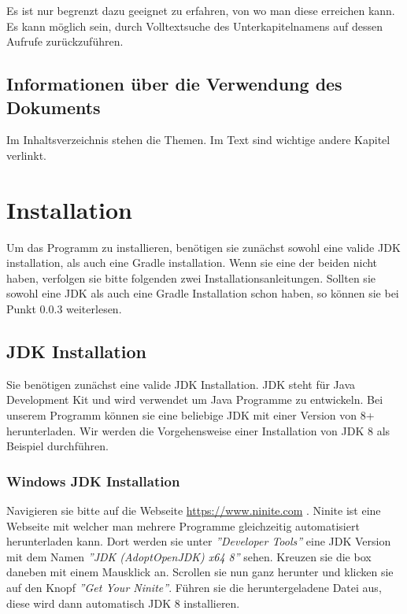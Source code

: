 \documentclass[fontsize=12pt,paper=a4,twoside]{scrartcl}
\begin{document}
Es ist nur begrenzt dazu geeignet zu erfahren, von wo man diese erreichen kann. Es kann möglich sein, durch Volltextsuche des Unterkapitelnamens auf dessen Aufrufe zurückzuführen.

\subsection{Informationen über die Verwendung des Dokuments}

Im Inhaltsverzeichnis stehen die Themen. Im Text sind wichtige andere Kapitel verlinkt. 

\newpage






\section{Installation}

Um das Programm zu installieren, benötigen sie zunächst sowohl eine valide JDK 
installation, als auch eine Gradle installation. Wenn sie eine der beiden nicht haben, 
verfolgen sie bitte folgenden zwei Installationsanleitungen. Sollten sie sowohl eine JDK 
als auch eine Gradle Installation schon haben, so können sie bei Punkt 0.0.3 
weiterlesen.

\subsection{JDK Installation}

Sie benötigen zunächst eine valide JDK Installation. JDK steht für Java Development Kit und wird verwendet um Java Programme zu entwickeln.
Bei unserem Programm können sie eine beliebige JDK mit einer Version von 8+ herunterladen. Wir werden die Vorgehensweise einer Installation von JDK  8 als Beispiel durchführen.

\subsubsection{Windows JDK Installation}

Navigieren sie bitte auf die Webseite \url{https://www.ninite.com} . Ninite ist eine Webseite mit welcher man mehrere Programme gleichzeitig automatisiert herunterladen kann. Dort werden sie unter \textit{''Developer Tools''} eine JDK Version mit dem Namen \textit{''JDK (AdoptOpenJDK) x64 8''} sehen. Kreuzen sie die box daneben mit einem Mausklick an. Scrollen sie nun ganz herunter und klicken sie auf den Knopf \textit{''Get Your Ninite''}. Führen sie die heruntergeladene Datei aus, diese wird dann automatisch JDK 8 installieren.
\end{document}
